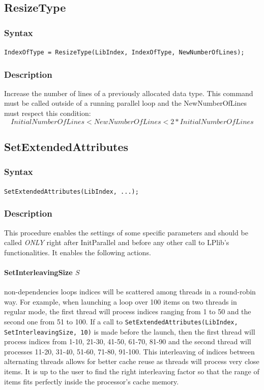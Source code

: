 \documentclass[a4paper,12pt]{article}
\begin{document}
\subsection{ResizeType}

\subsubsection*{Syntax}
\tt{IndexOfType = ResizeType(LibIndex, IndexOfType, NewNumberOfLines);}
\normalfont

\subsubsection*{Description}
Increase the number of lines of a previously allocated data type. This command must be called outside of a running parallel loop and the NewNumberOfLines must respect this condition: $$ InitialNumberOfLines < NewNumberOfLines < 2*InitialNumberOfLines $$


\subsection{SetExtendedAttributes}

\subsubsection*{Syntax}
\tt{SetExtendedAttributes(LibIndex, ...);}
\normalfont

\subsubsection*{Description}
This procedure enables the settings of some specific parameters and should be called \emph{ONLY} right after InitParallel and before any other call to LPlib's functionalities.
It enables the following actions.

\paragraph{SetInterleavingSize $S$} non-dependencies loops indices will be scattered among threads in a round-robin way. For example, when launching a loop over 100 items on two threads in regular mode, the first thread will process indices ranging from 1 to 50 and the second one from 51 to 100. If a call to {\tt SetExtendedAttributes(LibIndex, SetInterleavingSize, 10)} is made before the launch, then the first thread will process indices from 1-10, 21-30, 41-50, 61-70, 81-90 and the second thread will processes 11-20, 31-40, 51-60, 71-80, 91-100. This interleaving of indices between alternating threads allows for better cache reuse as threads will process very close items. It is up to the user to find the right interleaving factor so that the range of items fits perfectly inside the processor's cache memory.
\end{document}
